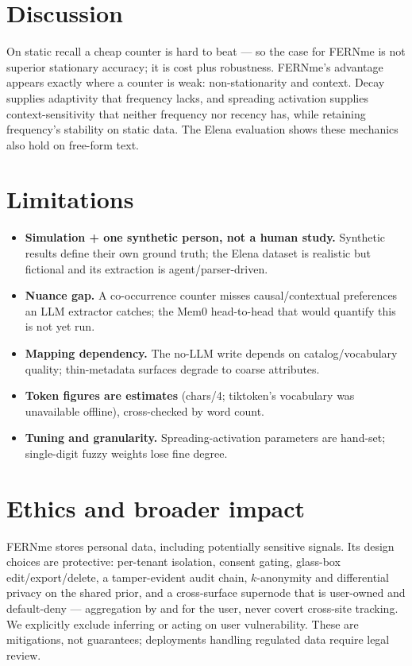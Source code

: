 \documentclass[11pt]{article}
\begin{document}
\section{Discussion}
On static recall a cheap counter is hard to beat --- so the case for FERNme is not
superior stationary accuracy; it is cost plus robustness. FERNme's advantage appears
exactly where a counter is weak: non-stationarity and context. Decay supplies adaptivity
that frequency lacks, and spreading activation supplies context-sensitivity that neither
frequency nor recency has, while retaining frequency's stability on static data. The Elena
evaluation shows these mechanics also hold on free-form text.

\section{Limitations}
\begin{itemize}[leftmargin=1.4em,itemsep=2pt]
\item \textbf{Simulation + one synthetic person, not a human study.} Synthetic results
define their own ground truth; the Elena dataset is realistic but fictional and its
extraction is agent/parser-driven.
\item \textbf{Nuance gap.} A co-occurrence counter misses causal/contextual preferences an
LLM extractor catches; the Mem0 head-to-head that would quantify this is not yet run.
\item \textbf{Mapping dependency.} The no-LLM write depends on catalog/vocabulary quality;
thin-metadata surfaces degrade to coarse attributes.
\item \textbf{Token figures are estimates} (chars/4; tiktoken's vocabulary was unavailable
offline), cross-checked by word count.
\item \textbf{Tuning and granularity.} Spreading-activation parameters are hand-set;
single-digit fuzzy weights lose fine degree.
\end{itemize}

\section{Ethics and broader impact}
FERNme stores personal data, including potentially sensitive signals. Its design choices
are protective: per-tenant isolation, consent gating, glass-box edit/export/delete, a
tamper-evident audit chain, $k$-anonymity and differential privacy on the shared prior, and
a cross-surface supernode that is user-owned and default-deny --- aggregation by and for the
user, never covert cross-site tracking. We explicitly exclude inferring or acting on user
vulnerability. These are mitigations, not guarantees; deployments handling regulated data
require legal review.
\end{document}
